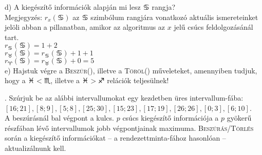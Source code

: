 \documentclass[12pt]{article}
\begin{document}
\noindent d) A kiegészítő információk alapján mi lesz $\cancer$ rangja?\\
Megjegyzés: $r_{x}(\cancer)$ az $\cancer$ szimbólum rangjára vonatkozó aktuális ismereteinket jelöli abban a pillanatban, amikor az algoritmus az $x$ jelű csúcs feldolgozásánál tart. \\
$r_{\cancer}(\cancer)=1+2$\\
$r_{\taurus}(\cancer)=r_{\cancer}(\cancer)+1+1$\\
$r_{\aries}(\cancer)=r_{\taurus}(\cancer)+0=5$\\

\noindent e) Hajstuk végre a {\scshape Beszúr(\pisces)}, illetve a {\scshape Töröl(\scorpio)} műveleteket, amennyiben tudjuk, hogy a $\pisces < \scorpio$, illetve a $\pisces > \sagittarius$ relációk teljesülnek!

\begin{figure}[!h]
\centering
\end{figure}

. Szúrjuk be az alábbi intervallumokat egy kezdetben üres intervallum-fába: \\
$[16;21], [8;9], [5;8], [25;30], [15;23], [17;19],
[26;26], [0;3], [6;10]$.\\
A beszúrásnál bal végpont a kulcs. $p$ csúcs kiegészítő információja a $p$ gyökerű részfában lévő intervallumok jobb végpontjainak maximuma.
{\scshape Beszúrás/Törlés} során a kiegészítő információkat -- a rendezettminta-fához hasonlóan -- aktualizálnunk kell.
\end{document}
